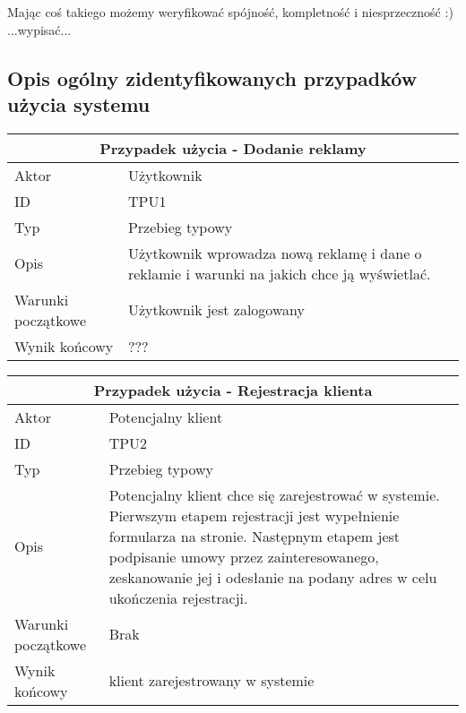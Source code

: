 \documentclass[10pt,a4paper,titlepage]{article} %
\begin{document}
		Mając coś takiego możemy weryfikować spójność, kompletność i niesprzeczność :)\newline
		...wypisać...\newline

		\subsection{Opis ogólny zidentyfikowanych przypadków użycia systemu}

		\begin {center}
		\begin{tabular}{|l|p{10cm}|}
		  \hline
		  \multicolumn{2}{|c|}{\bf Przypadek użycia - Dodanie reklamy}\\\hline
		  \hline
		  Aktor & Użytkownik \\ \hline
		  ID & TPU1 \\ \hline
		  Typ & Przebieg typowy \\ \hline
		  Opis & Użytkownik wprowadza nową reklamę i dane o reklamie i warunki na jakich chce ją wyświetlać. \\ \hline
		  Warunki początkowe & Użytkownik jest zalogowany \\ \hline
		  Wynik końcowy & ??? \\
		  \hline
		\end{tabular}
		\end{center}
		
		\begin {center}
		\begin{tabular}{|l|p{10cm}|}
		  \hline
		  \multicolumn{2}{|c|}{\bf Przypadek użycia - Rejestracja klienta}\\\hline
		  \hline
		  Aktor & Potencjalny klient \\ \hline
		  ID & TPU2 \\ \hline
		  Typ & Przebieg typowy \\ \hline
		  Opis & Potencjalny klient chce się zarejestrować w systemie. Pierwszym etapem
		  rejestracji jest wypełnienie formularza na stronie. Następnym etapem jest podpisanie umowy przez
		  zainteresowanego, zeskanowanie jej i odesłanie na podany adres w celu
		  ukończenia rejestracji. \\
		  \hline Warunki początkowe & Brak \\ \hline
		  Wynik końcowy & klient zarejestrowany w systemie \\
		  \hline
		\end{tabular}
		\end{center}
\end{document}
